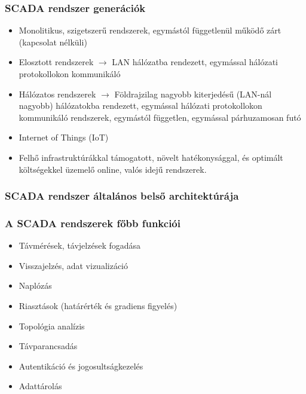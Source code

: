 \subsubsection{SCADA rendszer generációk}
\begin{itemize}
    \item Monolitikus, szigetszerű rendszerek, egymástól függetlenül működő zárt (kapcsolat nélküli)
    \item Elosztott rendszerek $\rightarrow$ LAN hálózatba rendezett, egymással hálózati protokollokon kommunikáló
    \item Hálózatos rendszerek $\rightarrow$ Földrajzilag nagyobb kiterjedésű (LAN-nál nagyobb) hálózatokba rendezett, egymással hálózati protokollokon kommunikáló rendszerek, egymástól független, egymással párhuzamosan futó
    \item Internet of Things (IoT)
    \item Felhő infrastruktúrákkal támogatott, növelt hatékonysággal, és optimált költségekkel üzemelő online, valós idejű rendszerek.
\end{itemize}

\subsubsection{SCADA rendszer általános belső architektúrája}

\clearpage
\subsubsection{A SCADA rendszerek főbb funkciói}
\begin{itemize}
    \item Távmérések, távjelzések fogadása
    \item Visszajelzés, adat vizualizáció
    \item Naplózás
    \item Riasztások (határérték és gradiens figyelés)
    \item Topológia analízis
    \item Távparancsadás
    \item Autentikáció és jogosultságkezelés
    \item Adattárolás
\end{itemize}

